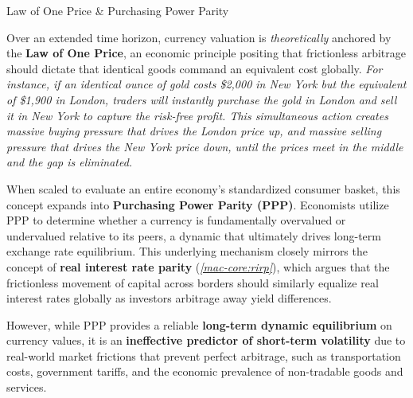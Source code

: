 \documentclass[10pt]{article}
\begin{document}
  \begin{core}{Law of One Price \& Purchasing Power Parity}

    Over an extended time horizon, currency valuation is \textit{theoretically} anchored by the \textbf{Law of One Price}, an economic principle positing that frictionless arbitrage should dictate that identical goods command an equivalent cost globally. \textit{For instance, if an identical ounce of gold costs \$2,000 in New York but the equivalent of \$1,900 in London, traders will instantly purchase the gold in London and sell it in New York to capture the risk-free profit. This simultaneous action creates massive buying pressure that drives the London price up, and massive selling pressure that drives the New York price down, until the prices meet in the middle and the gap is eliminated.}

    When scaled to evaluate an entire economy's standardized consumer basket, this concept expands into \textbf{Purchasing Power Parity (PPP)}. Economists utilize PPP to determine whether a currency is fundamentally overvalued or undervalued relative to its peers, a dynamic that ultimately drives long-term exchange rate equilibrium. This underlying mechanism closely mirrors the concept of \textbf{real interest rate parity} (\textit{\autoref{mac-core:rirp}}), which argues that the frictionless movement of capital across borders should similarly equalize real interest rates globally as investors arbitrage away yield differences.

    However, while PPP provides a reliable \textbf{long-term dynamic equilibrium} on currency values, it is an \textbf{ineffective predictor of short-term volatility} due to real-world market frictions that prevent perfect arbitrage, such as transportation costs, government tariffs, and the economic prevalence of non-tradable goods and services.

  \end{core}
\end{document}
